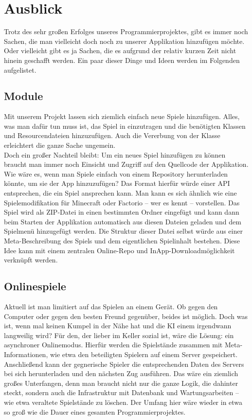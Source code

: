 \chapter{Ausblick}
\chapterauthor{\frank}

Trotz des sehr großen Erfolges unseres Programmierprojektes, gibt es immer noch
Sachen, die man vielleicht doch noch zu unserer Applikation hinzufügen möchte.
Oder vielleicht gibt es ja Sachen, die es aufgrund der relativ kurzen Zeit nicht
hinein geschafft werden. Ein paar dieser Dinge und Ideen werden im Folgenden
aufgelistet.

\section{Module}

Mit unserem Projekt lassen sich ziemlich einfach neue Spiele hinzufügen. Alles,
was man dafür tun muss ist, das Spiel in  einzutragen und die
benötigten Klassen und Resourcendateien hinzuzufügen. Auch die Vererbung von der
Klasse  erleichtert die ganze Sache ungemein.\\ Doch ein
großer Nachteil bleibt: Um ein neues Spiel hinzufügen zu können braucht man
immer noch Einsicht und Zugriff auf den Quellcode der Applikation. Wie wäre es,
wenn man Spiele einfach von einem Repository herunterladen könnte, um sie der
App hinzuzufügen? Das Format hierfür würde einer API entsprechen, die ein Spiel
ansprechen kann. Man kann es sich ähnlich wie eine Spielemodifikation für
Minecraft oder Factorio -- wer es kennt -- vorstellen. Das Spiel wird als
ZIP-Datei in einen bestimmten Ordner eingefügt und kann dann beim Starten der
Applikation automatisch aus diesen Dateien geladen und dem Spielmenü hinzugefügt
werden. Die Struktur dieser Datei selbst würde aus einer Meta-Beschreibung des
Spiels und dem eigentlichen Spielinhalt bestehen. Diese Idee kann mit einem
zentralen Online-Repo und InApp-Downloadmöglichkeit verknüpft werden.

\section{Onlinespiele}

Aktuell ist man limitiert auf das Spielen an einem Gerät. Ob gegen den Computer
oder gegen den besten Freund gegenüber, beides ist möglich. Doch was ist, wenn
mal keinen Kumpel in der Nähe hat und die KI einem irgendwann langweilig wird?
Für den, der lieber im Keller sozial ist, wäre die Lösung: ein asynchroner
Onlinemodus. Hierfür werden die Spielstände zusammen mit Meta-Informationen, wie
etwa den beteiligten Spielern auf einem Server gespeichert. Anschließend kann
der gegnerische Spieler die entsprechenden Daten des Servers bei sich
herunterladen und den nächsten Zug ausführen. Das wäre ein ziemlich großes
Unterfangen, denn man braucht nicht nur die ganze Logik, die dahinter steckt,
sondern auch die Infrastruktur mit Datenbank und Wartungsarbeiten -- wie etwa
veraltete Spielstände zu löschen. Der Umfang hier wäre wieder in etwa so groß
wie die Dauer eines gesamten Programmierprojektes.